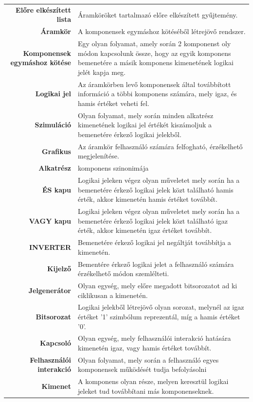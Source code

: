 \begin{longtable}{r p{10cm}}
\textbf{Előre elkészített lista} & Áramköröket tartalmazó előre elkészített gyűjtemény. \\
\textbf{Áramkör} & A komponensek egymáshoz kötéséből létrejövő rendszer. \\
\textbf{Komponensek egymáshoz kötése} & Egy olyan folyamat, amely során 2 komponenst oly módon kapcsolunk össze, hogy az egyik komponens bemenetére a másik komponens kimenetének logikai jelét kapja meg.\\
\textbf{Logikai jel} & Az áramkörben levő komponensek által továbbított információ a többi komponens számára, mely igaz, és hamis értéket veheti fel.\\
\textbf{Szimuláció} & Olyan folyamat, mely során minden alkatrész kimenetének logikai jel értékét kiszámoljuk a bemenetére érkező logikai jelekből.\\
\textbf{Grafikus} & Az áramkör felhasználó számára felfogható, érzékelhető megjelenítése.\\
\textbf{Alkatrész} & komponens szinonimája\\
\textbf{ÉS kapu} & Logikai jeleken végez olyan műveletet mely során ha a bemenetére érkező logikai jelek közt található hamis érték, akkor kimenetén hamis értéket továbbít. \\
\textbf{VAGY kapu} & Logikai jeleken végez olyan műveletet mely során ha a bemenetére érkező logikai jelek közt található igaz érték, akkor kimenetén igaz értéket továbbít. \\
\textbf{INVERTER} & Bemenetére érkező logikai jel negáltját továbbítja a kimenetén. \\
\textbf{Kijelző} & Bementére érkező logikai jelet a felhasználó számára érzékelhető módon szemlélteti. \\
\textbf{Jelgenerátor} & Olyan egység, mely előre megadott bitsorozatot ad ki ciklikusan a kimenetén.\\
\textbf{Bitsorozat} & Logikai jelekből létrejövő olyan sorozat, melynél az igaz értéket ’1’ szimbólum reprezentál, míg a hamis értéket ’0’.\\
\textbf{Kapcsoló} & Olyan egység, mely felhasználói interakció hatására kimenetén igaz, vagy hamis értéket továbbít. \\
\textbf{Felhasználói interakció} & Olyan folyamat, mely során a felhasználó egyes komponensek működését tudja befolyásolni \\
\textbf{Kimenet} & A komponens olyan része, melyen keresztül logikai jeleket tud továbbítani más komponenseknek.\\

\end{longtable}
